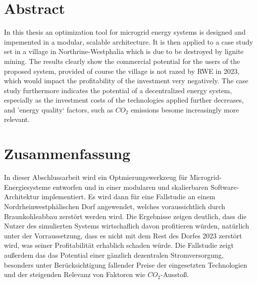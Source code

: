 \documentclass[
	11pt,								%
	DIV10,								%
	a4paper,         					%
	oneside,							%
	headheight=20pt,					%
	footheight=20pt,					%
    parskip=full,						%
    listof=totoc,						%
	bibliography=totoc,					%
	index=totoc,						%
]{scrartcl}
\begin{document}
	\newpage


	\section*{Abstract}
	
	In this thesis an optimization tool for microgrid energy systems is designed and impemented in a modular, scalable architecture. It is then applied to a case study set in a village in Northrine-Westphalia which is due to be destroyed by lignite mining. The results clearly show the commercial potential for the users of the proposed system, provided of course the village is not razed by RWE in 2023, which would impact the profitability of the investment very negatively. The case study furthermore indicates the potential of a decentralized energy system, especially as the investment costs of the technologies applied further decreases, and 'energy quality` factors, such as $CO_2$ emissions besome increasingly more relevant.
	
	\section*{Zusammenfassung}
	
	In dieser Abschlussarbeit wird ein Optmierungswerkzeug für Microgrid-Energiesysteme entworfen und in einer modularen und skalierbaren Software-Architektur implementiert. Es wird dann für eine Fallstudie an einem Nordrheinwestphälischen Dorf angewendet, welches voraussichtlich durch Braunkohleabbau zerstört werden wird. Die Ergebnisse zeigen deutlich, dass die Nutzer des simulierten Systems wirtschaflich davon profitieren würden, natürlich unter der Vorraussetzung, dass es nicht mit dem Rest des Dorfes 2023 zerstört wird, was seiner Profitabilität erhablich schaden würde. Die Fallstudie zeigt außerdem das  das Potential einer gänzlich dezentralen Stromversorgung, besonders unter Berücksichtigung fallender Preise der eingesetzten Technologien und der steigenden Relevanz von Faktoren wie $CO_2$-Ausstoß.
	
	
		\newpage	

	
\end{document}
